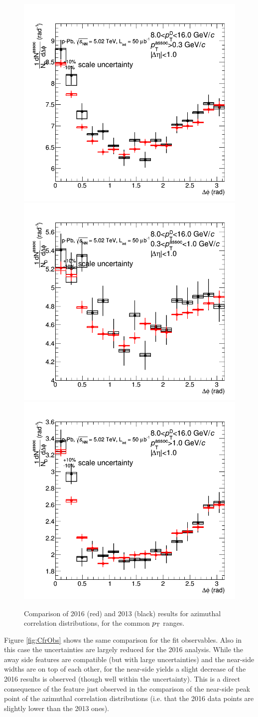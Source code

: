 \begin{figure}[!htbp]
{\includegraphics[width=0.47\linewidth]{figures/Cfr2013vs2016/Average_Cfr_2013_2016_Pt8to16_Thr03to99.png}}
{\includegraphics[width=0.47\linewidth]{figures/Cfr2013vs2016/Average_Cfr_2013_2016_Pt8to16_Thr03to1.png}}
{\includegraphics[width=0.47\linewidth]{figures/Cfr2013vs2016/Average_Cfr_2013_2016_Pt8to16_Thr1to99.png}}
\caption{Comparison of 2016 (red) and 2013 (black) results for azimuthal correlation distributions, for the common $p_{\rm T}$ ranges.}
\label{fig:CfrAverage}
\end{figure}

Figure \ref{fig:CfrObs} shows the same comparison for the fit observables. Also in this case the uncertainties are largely reduced for the 2016 analysis. While the away side features are compatible (but with large uncertainties) and the near-side widths are on top of each other, for the near-side yields a slight decrease of the 2016 results is observed (though well within the uncertainty). This is a direct consequence of the feature just observed in the comparison of the near-side peak point of the azimuthal correlation distributions (i.e. that the 2016 data points are slightly lower than the 2013 ones).

